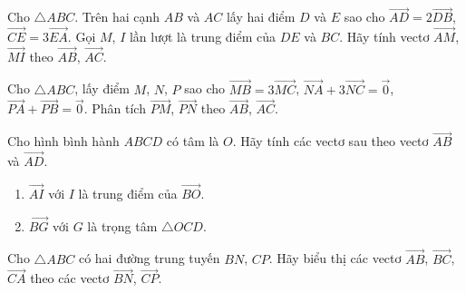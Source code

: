 \begin{bt}%
	Cho $\triangle ABC$. Trên hai cạnh $AB$ và $AC$ lấy hai điểm $D$ và $E$ sao cho $\overrightarrow{AD}=2\overrightarrow{DB}$, $\overrightarrow{CE}=3\overrightarrow{EA}$. Gọi $M$, $I$ lần lượt là trung điểm của $DE$ và $BC$. Hãy tính vectơ $\overrightarrow{AM}$, $\overrightarrow{MI}$ theo $\overrightarrow{AB}$, $\overrightarrow{AC}$.
\end{bt}

\begin{bt}%
	Cho $\triangle ABC$, lấy điểm $M$, $N$, $P$ sao cho $\overrightarrow{MB}=3\overrightarrow{MC}$, $\overrightarrow{NA}+3\overrightarrow{NC}=\overrightarrow{0}$, $\overrightarrow{PA}+\overrightarrow{PB}=\overrightarrow{0}$. Phân tích $\overrightarrow{PM}$, $\overrightarrow{PN}$ theo $\overrightarrow{AB}$, $\overrightarrow{AC}$.
\end{bt}

\begin{bt}%
	Cho hình bình hành $ABCD$ có tâm là $O$. Hãy tính các vectơ sau theo vectơ $\overrightarrow{AB}$ và $\overrightarrow{AD}$.
	\begin{enumerate}
		\item $\overrightarrow{AI}$ với $I$ là trung điểm của $\overrightarrow{BO}$.
		\item $\overrightarrow{BG}$ với $G$ là trọng tâm $\triangle OCD$.
	\end{enumerate}
\end{bt}

\begin{bt}%
	Cho $\triangle ABC$ có hai đường trung tuyến $BN$, $CP$. Hãy biểu thị các vectơ $\overrightarrow{AB}$, $\overrightarrow{BC}$, $\overrightarrow{CA}$ theo các vectơ $\overrightarrow{BN}$, $\overrightarrow{CP}$.
\end{bt}

